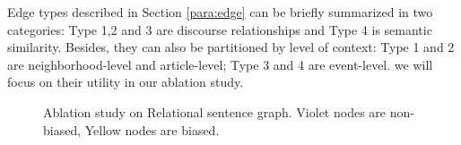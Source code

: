 Edge types described in Section \ref{para:edge} can be briefly summarized in two categories: Type 1,2 and 3 are discourse relationships and Type 4 is semantic similarity. Besides, they can also be partitioned by level of context: Type 1 and 2 are neighborhood-level and article-level; Type 3 and 4 are event-level. we will focus on their utility in our ablation study. 
\begin{figure}[!htbp]\centering
    \caption{Ablation study on Relational sentence graph. {Violet nodes} are non-biased, {Yellow nodes} are biased.}
    \label{fig:ablation}
  \end{figure}
